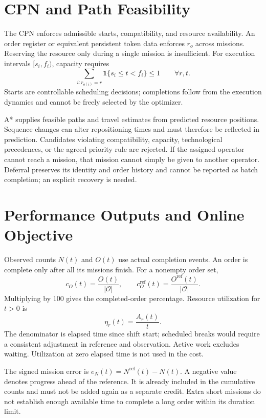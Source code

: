 \section{CPN and Path Feasibility}

The CPN enforces admissible starts, compatibility, and resource availability.
An order register or equivalent persistent token data enforces $r_o$ across
missions. Reserving the resource only during a single mission is insufficient.
For execution intervals $[s_i,f_i)$, capacity requires
\begin{equation}
 \sum_{i:r_{o(i)}=r}\mathbf1\{s_i\leq t<f_i\}\leq1\qquad\forall r,t.
\end{equation}
Starts are controllable scheduling decisions; completions follow from the
execution dynamics and cannot be freely selected by the optimizer.

A* supplies feasible paths and travel estimates from predicted resource
positions. Sequence changes can alter repositioning times and must therefore
be reflected in prediction. Candidates violating compatibility, capacity,
technological precedences, or the agreed priority rule are rejected. If the
assigned operator cannot reach a mission, that mission cannot simply be
given to another operator. Deferral preserves its identity and order history
and cannot be reported as batch completion; an explicit recovery is needed.

\section{Performance Outputs and Online Objective}

Observed counts $N(t)$ and $O(t)$ use actual completion events. An order is
complete only after all its missions finish. For a nonempty order set,
\begin{equation}
 c_O(t)=\frac{O(t)}{|\mathcal O|},\qquad
 c_O^{\mathrm{ref}}(t)=\frac{O^{\mathrm{ref}}(t)}{|\mathcal O|}.
\end{equation}
Multiplying by 100 gives the completed-order percentage. Resource utilization
for $t>0$ is
\begin{equation}
 \eta_r(t)=\frac{A_r(t)}{t}.
\end{equation}
The denominator is elapsed time since shift start; scheduled breaks would
require a consistent adjustment in reference and observation. Active work
excludes waiting. Utilization at zero elapsed time is not used in the cost.

The signed mission error is $e_N(t)=N^{\mathrm{ref}}(t)-N(t)$. A negative
value denotes progress ahead of the reference. It is already included in the
cumulative counts and must not be added again as a separate credit. Extra
short missions do not establish enough available time to complete a long
order within its duration limit.

